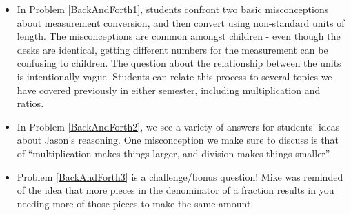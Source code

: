 \documentclass[nooutcomes]{ximera}
\begin{document}
\begin{instructorNotes}
\begin{itemize}
    \item In Problem \ref{BackAndForth1}, students confront two basic misconceptions about measurement conversion, and then convert using non-standard units of length.  The misconceptions are common amongst children - even though the desks are identical, getting different numbers for the measurement can be confusing to children.  The question about the relationship between the units is intentionally vague.  Students can relate this process to several topics we have covered previously in either semester, including multiplication and ratios.
    \item In Problem \ref{BackAndForth2}, we see a variety of answers for students' ideas about Jason's reasoning.  One misconception we make sure to discuss is that of ``multiplication makes things larger, and division makes things smaller''. 
    \item Problem \ref{BackAndForth3} is a challenge/bonus question!  Mike was reminded of the idea that more pieces in the denominator of a fraction results in you needing more of those pieces to make the same amount.
\end{itemize}




\end{instructorNotes}
\end{document}
